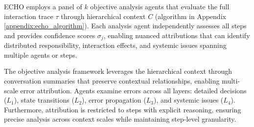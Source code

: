 \documentclass{article}
\begin{document}
ECHO employs a panel of $k$ objective analysis agents that evaluate the full interaction trace $\tau$ through hierarchical context $C$ (algorithm in Appendix \ref{appendix:echo_algorithm}). Each analysis agent independently assesses all steps and provides confidence scores $\sigma_j$, enabling nuanced attributions that can identify distributed responsibility, interaction effects, and systemic issues spanning multiple agents or steps.

The objective analysis framework leverages the hierarchical context through conversation summaries that preserve contextual relationships, enabling multi-scale error attribution. Agents examine errors across all layers: detailed decisions ($L_1$), state transitions ($L_2$), error propagation ($L_3$), and systemic issues ($L_4$). Furthermore, attribution is restricted to steps with explicit reasoning, ensuring precise analysis across context scales while maintaining step-level granularity.
\end{document}
